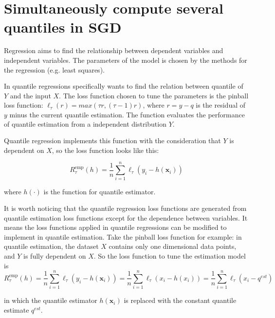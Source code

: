 \chapter{Simultaneously compute several quantiles in SGD}
\label{ch: simultaneous_quant}

Regression aims to find the relationship between dependent variables and independent variables. The parameters of the model is chosen by the methods for the regression (e.g. least squares).

In quantile regressions specifically wants to find the relation between quantile of $Y$ and the input $X$. The loss function chosen to tune the parameters is the pinball loss function: $\ell_{\tau}(r) = max(\tau r, (\tau - 1)r)$, where $r = y - q$ is the residual of $y$ minus the current quantile estimation. The function evaluates the performance of quantile estimation from a independent distribution $Y$. 

Quantile regression implements this function with the consideration that $Y$ is dependent on $X$, so the loss function looks like this:

\begin{equation}
    R_{\tau}^{\mathrm{emp}}(h)=\frac{1}{n} \sum_{i=1}^{n} \ell_{\tau}\left(y_{i}-h\left(\mathbf{x}_{i}\right)\right)
\end{equation}


where $h(\cdot)$ is the function for quantile estimator.

It is worth noticing that the quantile regression loss functions are generated from quantile estimation loss functions except for the dependence between variables. It means the loss functions applied in quantile regressions can be modified to implement in quantile estimation. Take the pinball loss function for example:
in quantile estimation, the dataset $X$ contains only one dimensional data points, and $Y$ is fully dependent on $X$. So the loss function to tune the estimation model is
\begin{equation}
    R_{\tau}^{\mathrm{emp}}(h)=\frac{1}{n} \sum_{i=1}^{n} \ell_{\tau}\left(y_{i}-h\left(\mathbf{x}_{i}\right)\right)
        = \frac{1}{n} \sum_{i=1}^{n} \ell_{\tau}\left(x_{i}-h\left({x}_{i}\right)\right) 
        = \frac{1}{n} \sum_{i=1}^{n} \ell_{\tau}\left(x_{i}- q^{est}\right) 
\end{equation}

in which the quantile estimator $h\left(\mathbf{x}_{i}\right)$ is replaced with the constant quantile estimate $q^{est}$.

